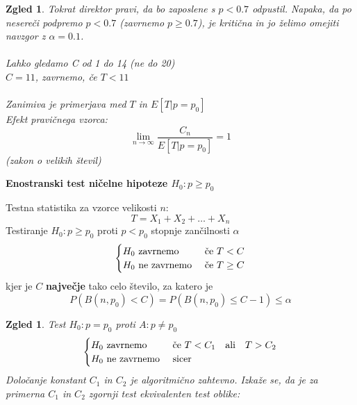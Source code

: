 \documentclass[11pt]{article}
\newtheorem{Zgled}[Izrek]{{\sc Zgled}}
\begin{document}
	\begin{Zgled}
		Tokrat direktor pravi, da bo zaposlene s $p< 0.7$ odpustil. Napaka, da po nesereči podpremo $p<0.7$ (zavrnemo $p\ge 0.7$), je kritična in jo želimo omejiti navzgor z $\alpha = 0.1$.
		\\
		\\
		Lahko gledamo C od 1 do 14 (ne do 20)
		\\
		$C = 11$, zavrnemo, če $T<11$
		\\
		\\
		Zanimiva je primerjava med $T$ in $E[T|p=p_0]$
		\\
		Efekt pravičnega vzorca:
		$$\lim\limits_{n\to \infty}{\frac{C_n}{E[T|p=p_0]}} = 1$$ (zakon o velikih števil)
	\end{Zgled}
		\begin{framed}
		\begin{center}
			\textbf{Enostranski test ničelne hipoteze $H_0: p\ge p_0$}
		\end{center}
		Testna statistika za vzorce velikosti $n$:
		$$T = X_1 + X_2 +\ldots + X_n$$
		Testiranje $H_0: p\ge p_0$ proti $p < p_0$ stopnje zančilnosti $\alpha$
		\[
		\begin{cases}
		H_0 \textnormal{ zavrnemo } & \textnormal{če } T< C\\
		H_0 \textnormal{ ne zavrnemo } & \textnormal{če }  T\ge C
		\end{cases}
		\]
		kjer je $C$ \textbf{največje} tako celo število, za katero je 
		$$P(B(n,p_0) < C) = P(B(n,p_0) \le C-1) \le \alpha$$
	\end{framed}
\pagebreak
	\begin{Zgled}
		Test $H_0 : p = p_0$ proti $A: p \ne p_0$
		\[
		\begin{cases}
		H_0 \textnormal{ zavrnemo } & \textnormal{če   } T<C_1 \quad \textnormal{ali} \quad T>C_2 \\
		H_0 \textnormal{ ne zavrnemo } & \textnormal{sicer}
		\end{cases}
		\]
		Določanje konstant $C_1$ in $C_2$ je algoritmično zahtevno. Izkaže se, da je za primerna $C_1$ in $C_2$ zgornji test ekvivalenten test oblike:
	\end{Zgled}
\end{document}
